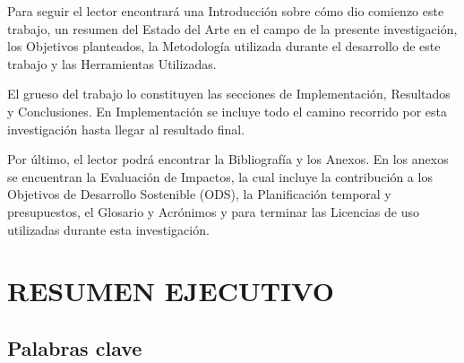 \documentclass[a4paper, 12pt, spanish, twoside]{article}
\newcommand\blankpage{%
    \null
    \thispagestyle{empty}%
    \newpage}
\begin{document}
Para seguir el lector encontrará una Introducción sobre cómo dio comienzo este trabajo, un resumen del Estado del Arte en el campo de la presente investigación, los Objetivos planteados, la Metodología utilizada durante el desarrollo de este trabajo y las Herramientas Utilizadas. 

El grueso del trabajo lo constituyen las secciones de Implementación, Resultados y Conclusiones. En Implementación se incluye todo el camino recorrido por esta investigación hasta llegar al resultado final.

Por último, el lector podrá encontrar la Bibliografía y los Anexos. En los anexos se encuentran la Evaluación de Impactos, la cual incluye la contribución a los Objetivos de Desarrollo Sostenible (ODS), la Planificación temporal y presupuestos, el Glosario y Acrónimos y para terminar las Licencias de uso utilizadas durante esta investigación.

\clearpage
\afterpage{\blankpage} %





\newpage
\section*{RESUMEN EJECUTIVO} %



\subsection*{Palabras clave} %
\end{document}

